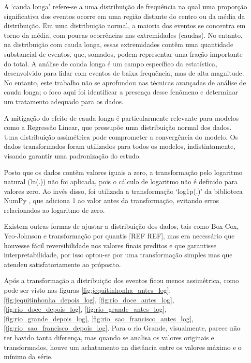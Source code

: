 A `cauda longa' refere-se a uma distribuição de frequência na qual uma proporção significativa dos eventos ocorre em uma região distante do centro ou da média da distribuição. Em uma distribuição normal, a maioria dos eventos se concentra em torno da média, com poucas ocorrências nas extremidades (caudas). No entanto, na distribuição com cauda longa, essas extremidades contêm uma quantidade substancial de eventos, que, somados, podem representar uma fração importante do total. A análise de cauda longa é um campo específico da estatística, desenvolvido para lidar com eventos de baixa frequência, mas de alta magnitude. No entanto, este trabalho não se aprofundou nas técnicas avançadas de análise de cauda longa; o foco aqui foi identificar a presença desse fenômeno e determinar um tratamento adequado para os dados.

A mitigação do efeito de cauda longa é particularmente relevante para modelos como a Regressão Linear, que pressupõe uma distribuição normal dos dados. Uma distribuição assimétrica pode comprometer a convergência do modelo. Os dados transformados foram utilizados para todos os modelos, indistintamente, visando garantir uma padronização do estudo.


Posto que os dados contêm valores iguais a zero, a transformação pelo logaritmo natural (ln(.)) não foi aplicada, pois o cálculo de logaritmo não é definido para valores zero. Ao invés disso, foi utilizada a transformação `log1p(.)' da biblioteca NumPy \cite{numpyref}, que adiciona 1 ao valor antes da transformação, evitando erros relacionados ao logaritmo de zero.

Existem outras formas de ajustar a distribuição dos dados, tais como Box-Cox, Yeo-Johnson e transformação por quantis [REF REF], mas era necessário que houvesse fácil reversibilidade nos valores finais preditos e que garantisse interpretabilidade, por isso optou-se por uma transformação simples mas que atendeu satisfatoriamente ao próposito.

Após a transformação a distribuição dos eventos ficou menos assimétrica, como pode ser visto nas figuras \ref{fig:jequitinhonha_antes_log}, \ref{fig:jequitinhonha_depois_log}, \ref{fig:rio_doce_antes_log}, \ref{fig:rio_doce_depois_log}, \ref{fig:rio_grande_antes_log}, \ref{fig:rio_grande_depois_log}, \ref{fig:rio_sao_francisco_antes_log}, \ref{fig:rio_sao_francisco_depois_log}. Para o rio Grande, visualmente, parece não ter havido tanta diferença, mas quando se analisa os valores originais e transformados, houve um achatamento na distância entre os valores máximo e o mínimo da série.

